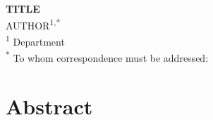 \documentclass[12pt]{article}
\newenvironment{tightcenter}{%
  \setlength\topsep{0pt}
  \setlength\parskip{0pt}
  \begin{center}
  }{%
  \end{center}
}
\newcommand{\Red}[1]{{\color{red}{#1}}}
\begin{document}
\begin{tightcenter}
  \textbf{TITLE}\\
  AUTHOR\textsuperscript{1,*}\\
  \textsuperscript{1} Department\\
  \textsuperscript{*} To whom correspondence must be addressed:
\end{tightcenter}

\section{Abstract}



\printbibliography

\end{document}
